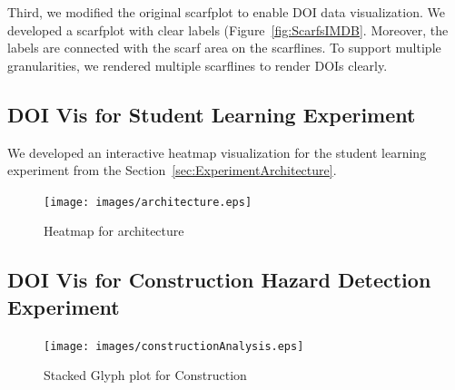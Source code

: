 Third, we modified the original scarfplot to enable DOI data visualization. We developed a scarfplot with clear labels (Figure~\ref{fig:ScarfsIMDB}. Moreover, the labels are connected with the scarf area on the scarflines. To support multiple granularities, we rendered multiple scarflines to render DOIs clearly. 

\subsection{DOI Vis for Student Learning Experiment}
We developed an interactive heatmap visualization for the student learning experiment from the Section~\ref{sec:ExperimentArchitecture}.  
\begin{figure}
  \centering
  \texttt{[image: images/architecture.eps]}
  \caption{Heatmap for architecture }
	\label{fig:HeatmapArchitecture}
\end{figure}

\subsection{DOI Vis for Construction Hazard Detection Experiment}
\begin{figure}
  \centering
  \texttt{[image: images/constructionAnalysis.eps]}
  \caption{Stacked Glyph plot for Construction}
	\label{fig:constructionAnalysis}
\end{figure}
